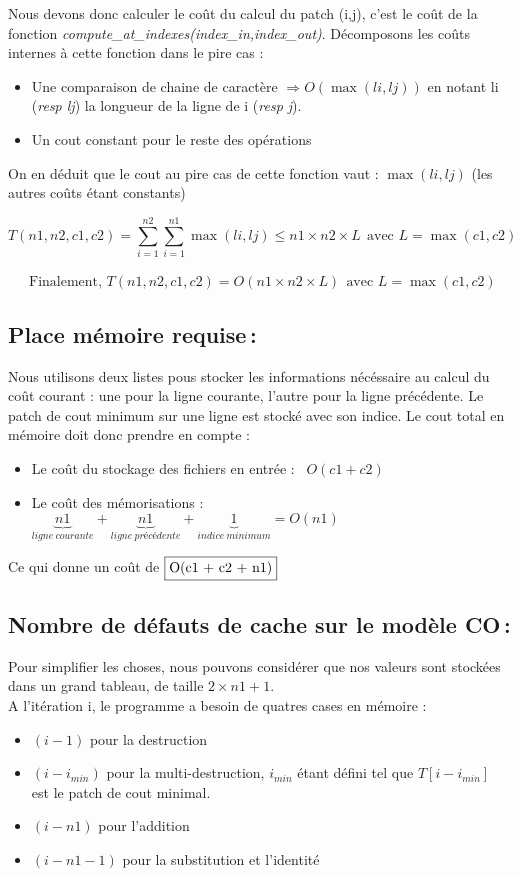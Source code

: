 \documentclass[a4paper, 10pt, french]{article}
\begin{document}
	Nous devons donc calculer le coût du calcul du patch (i,j), c'est le coût de la fonction \emph{compute\_at\_indexes(index\_in,index\_out)}.
	Décomposons les coûts internes à cette fonction dans le pire cas :
	\begin{itemize}
	\item Une comparaison de chaine de caractère $\Rightarrow  O(\max(li,lj))$ en notant li (\textit{resp lj}) la longueur de la ligne de i (\textit{resp j}).
	\item Un cout constant pour le reste des opérations
	\end{itemize}

	On en déduit que le cout au pire cas de cette fonction vaut : $\max(li,lj)$ (les autres coûts étant constants)

	\[T(n1,n2,c1,c2) = \sum_{i=1}^{n2} \sum_{i=1}^{n1} \max(li,lj) \leq n1 \times n2 \times L \ \ \text{avec } L = \max(c1,c2)\]

	 \ \ \ $\text{Finalement, } T(n1,n2,c1,c2) = O(n1 \times n2 \times L)\ \ \text{avec } L = \max(c1,c2) $

  \subsection{Place mémoire requise\,: }
	Nous utilisons deux listes pous stocker les informations nécéssaire au calcul du coût courant : une pour la ligne courante, l'autre pour la ligne
    précédente. Le patch de cout minimum sur une ligne est stocké avec son indice.
    Le cout total en mémoire doit donc prendre en compte :
    \begin{itemize}
    \item Le coût du stockage des fichiers en entrée : \ $O(c1 + c2)$
    \item Le coût des mémorisations :  $\underbrace{n1}_{ligne\ courante} + \underbrace{n1}_{ligne\ précédente} + \underbrace{1}_{indice \ minimum} = O(n1)$
    \end{itemize}

    Ce qui donne un coût de $\fbox{O(c1 + c2 + n1)}$

  \subsection{Nombre de défauts de cache sur le modèle CO\,: }
    Pour simplifier les choses, nous pouvons considérer que nos valeurs sont stockées dans un grand tableau, de taille $2 \times n1 + 1$.\\
    A l'itération i, le programme a besoin de quatres cases en mémoire :
    \begin{itemize}
    \item $(i-1)$ pour la destruction
    \item $(i - i_{min})$ pour la multi-destruction, $i_{min}$ étant défini tel que $T[i-i_{min}]$ est le patch de cout minimal.
    \item $(i - n1)$ pour l'addition
    \item $(i - n1 - 1)$ pour la substitution et l'identité
    \end{itemize}
\end{document}
